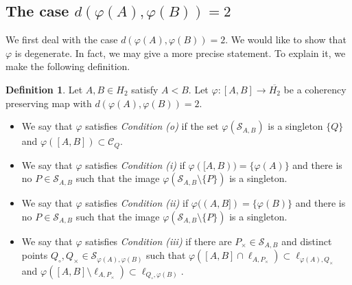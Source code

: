 \documentclass[10pt]{amsart}
\newtheorem{corollary}[theorem]{Corollary}
\theoremstyle{definition}
\newtheorem{definition}[theorem]{Definition}
\theoremstyle{remark}
\numberwithin{subsection}{section}
\numberwithin{equation}{section}
\newcommand\oH{{\overline{H_2}}}
\begin{document}
\subsection{The case $d(\varphi (A), \varphi (B)) =2$}\label{dab2}
We first deal with the case $d(\varphi (A), \varphi (B)) =2$. 
We would like to show that $\varphi$ is degenerate. 
In fact, we may give a more precise statement. 
To explain it, we make the following definition. 
\begin{definition}
Let $A, B\in H_2$ satisfy $A<B$. 
Let $\varphi\colon [A, B]\to \oH$ be a coherency preserving map with $d(\varphi(A), \varphi(B))=2$. 
\begin{itemize}
\item We say that $\varphi$ satisfies \emph{Condition (o)}  if the set $\varphi(\mathcal{S}_{A, B})$ is a singleton $\{Q\}$ and $\varphi([A, B])\subset \mathcal{C}_Q$. 
\item We say that $\varphi$ satisfies \emph{Condition (i)}  if $\varphi([A, B))=\{\varphi(A)\}$ and there is no $P\in \mathcal{S}_{A, B}$ such that the image $\varphi(\mathcal{S}_{A, B}\setminus \{P\})$ is a singleton. %
\item We say that $\varphi$ satisfies \emph{Condition (ii)}  if $\varphi((A, B])=\{\varphi(B)\}$ and there is no $P\in \mathcal{S}_{A, B}$ such that the image $\varphi(\mathcal{S}_{A, B}\setminus \{P\})$ is a singleton. %
\item We say that $\varphi$ satisfies \emph{Condition (iii)}  if there are $P_\times\in \mathcal{S}_{A, B}$ and distinct points $Q_\circ, Q_\times\in \mathcal{S}_{\varphi(A), \varphi(B)}$ such that $\varphi([A, B]\cap \ell_{A, P_\times})\subset \ell_{\varphi(A), Q_\times}$ and $\varphi([A, B]\setminus \ell_{A, P_\times})\subset \ell_{Q_\circ, \varphi(B)}$. 

\end{itemize}
\end{definition}
\end{document}
